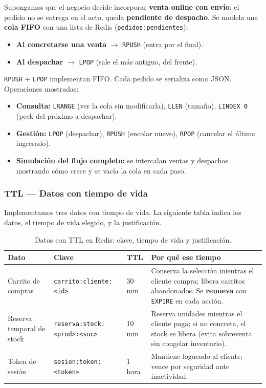 \documentclass[11pt,a4paper]{article}
\begin{document}
Supongamos que el negocio decide incorporar \textbf{venta online con envío}: el pedido no
se entrega en el acto, queda \textbf{pendiente de despacho}. Se modela una \textbf{cola
FIFO} con una lista de Redis (\texttt{pedidos:pendientes}):

\begin{itemize}[nosep]
    \item \textbf{Al concretarse una venta} $\rightarrow$ \texttt{RPUSH} (entra por el final).
    \item \textbf{Al despachar} $\rightarrow$ \texttt{LPOP} (sale el más antiguo, del frente).
\end{itemize}

\texttt{RPUSH} + \texttt{LPOP} implementan FIFO. Cada pedido se serializa como JSON.
Operaciones mostradas:

\begin{itemize}[nosep]
    \item \textbf{Consulta:} \texttt{LRANGE} (ver la cola sin modificarla), \texttt{LLEN}
    (tamaño), \texttt{LINDEX 0} (peek del próximo a despachar).
    \item \textbf{Gestión:} \texttt{LPOP} (despachar), \texttt{RPUSH} (encolar nuevo),
    \texttt{RPOP} (cancelar el último ingresado).
    \item \textbf{Simulación del flujo completo:} se intercalan ventas y despachos
    mostrando cómo crece y se vacía la cola en cada paso.
\end{itemize}

\subsubsection{TTL — Datos con tiempo de vida}

Implementamos tres datos con tiempo de vida. La siguiente tabla indica los datos, el
tiempo de vida elegido, y la justificación.

\begin{table}[ht]
\centering
\caption{Datos con TTL en Redis: clave, tiempo de vida y justificación.}
\renewcommand{\arraystretch}{1.5}
\begin{tabular}{@{}p{2.6cm}p{5.3cm}p{1.3cm}p{6cm}@{}}
\toprule
\textbf{Dato} & \textbf{Clave} & \textbf{TTL} & \textbf{Por qué ese tiempo} \\
\midrule
Carrito de compras & \texttt{carrito:cliente:<id>} & 30 min &
Conserva la selección mientras el cliente compra; libera carritos abandonados. Se
\textbf{renueva} con \texttt{EXPIRE} en cada acción. \\
Reserva temporal de stock & \texttt{reserva:stock:<prod>:<suc>} & 10 min &
Reserva unidades mientras el cliente paga; si no concreta, el stock se libera (evita
sobreventa sin congelar inventario). \\
Token de sesión & \texttt{sesion:token:<token>} & 1 hora &
Mantiene logueado al cliente; vence por seguridad ante inactividad. \\
\bottomrule
\end{tabular}
\end{table}
\end{document}
